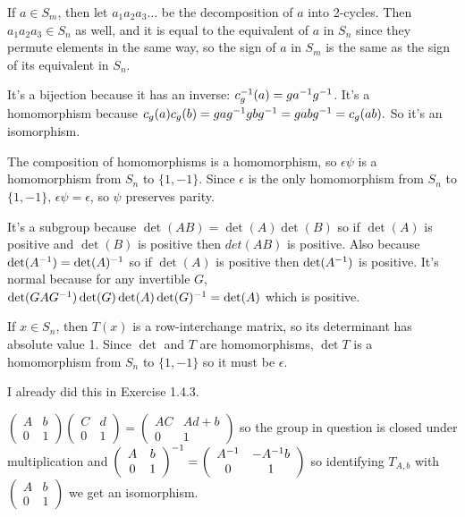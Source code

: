\documentclass[11pt, oneside]{article}   	%
\begin{document}
\item If $a \in S_m$, then let $a_1a_2a_3\ldots$ be the decomposition of $a$ into 2-cycles. Then $a_1a_2a_3 \in S_n$ as well, and it is equal to the equivalent of $a$ in $S_n$ since they permute elements in the same way, so the sign of $a$ in $S_m$ is the same as the sign of its equivalent in $S_n$.
\item It's a bijection because it has an inverse: $c_g^{-1}(a) = ga^{-1} g^{-1}$. It's a homomorphism because $c_g(a)c_g(b) = gag^{-1} gbg^{-1} = gabg^{-1} = c_g(ab).$ So it's an isomorphism.
\item The composition of homomorphisms is a homomorphism, so $\epsilon\psi$ is a homomorphism from $S_n$ to $\{1, -1\}$. Since $\epsilon$ is the only homomorphism from $S_n$ to $\{1, -1\}$, $\epsilon\psi = \epsilon$, so $\psi$ preserves parity.
\item \be
\item It's a subgroup because $\det(AB) = \det(A)\det(B)$ so if $\det(A)$ is positive and $\det(B)$ is positive then $det(AB)$ is positive. Also because $\det(A^{-1}) = \det(A)^{-1}$ so if $\det(A)$ is positive then $\det(A^{-1})$ is positive. It's normal because for any invertible $G$, $\det(GAG^{-1}) \det(G)\det(A)\det(G)^{-1} = \det(A)$ which is positive.
\item If $x\in S_n$, then $T(x)$ is a row-interchange matrix, so its determinant has absolute value 1. Since $\det$ and $T$ are homomorphisms, $\det T$ is a homomorphism from $S_n$ to $\{1, -1\}$ so it must be $\epsilon$.
\ee
\item \be
\item I already did this in Exercise 1.4.3.
\item $\left( \begin{array}{cc} A & b \\ 0 & 1 \end{array} \right) \left( \begin{array}{cc} C & d \\ 0 & 1 \end{array} \right) = \left( \begin{array}{cc} AC & Ad + b \\ 0 & 1 \end{array} \right)$ so the group in question is closed under multiplication and $\left( \begin{array}{cc} A & b \\ 0 & 1 \end{array} \right)^{-1} = \left( \begin{array}{cc} A^{-1} & -A^{-1} b \\ 0 & 1 \end{array} \right)$ so identifying $T_{A, b}$ with $\left( \begin{array}{cc} A & b \\ 0 & 1 \end{array} \right)$ we get an isomorphism. 
\end{document}
